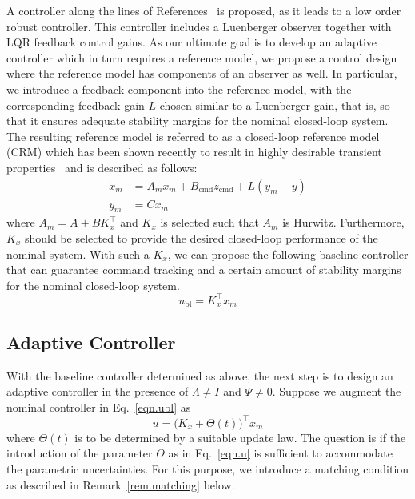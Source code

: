 \documentclass[]{../sty/JGCD}
\theoremstyle{examplestyle}
\begin{document}
  A controller along the lines of References\ \cite{lavretsky.output.2010,wise.obltrdesign.2013,qu.gnc.2013} is proposed, as it leads to a low order robust controller.
  This controller includes a Luenberger observer together with LQR feedback control gains.
  As our ultimate goal is to develop an adaptive controller which in turn requires a reference model, we propose a control design where the reference model has components of an observer as well.
  In particular, we introduce a feedback component into the reference model, with the corresponding feedback gain $L$ chosen similar to a Luenberger gain, that is, so that it ensures adequate stability margins for the nominal closed-loop system.
  The resulting reference model is referred to as a closed-loop reference model (CRM) which has been shown recently to result in highly desirable transient properties\ \cite{gibson.aiaacrm.2012,gibson.ecc.2013,gibson.ieeeaccess.2013,gibson.acc.2013} and is described as follows:
  \begin{equation}
    \begin{split}
      \label{eqn.refmodel}
      \dot{x}_{m}&=A_{m}x_{m}+B_{\text{cmd}}z_{\text{cmd}}+L(y_{m}-y) \\
      y_{m}&=Cx_{m}
    \end{split}
  \end{equation}
  where $A_{m}=A+BK_{x}^{\top}$ and $K_{x}$ is selected such that $A_{m}$ is Hurwitz.
  Furthermore, $K_{x}$ should be selected to provide the desired closed-loop performance of the nominal system.
  With such a $K_{x}$, we can propose the following baseline controller that can guarantee command tracking and a certain amount of stability margins for the nominal closed-loop system.
  \begin{equation}
    \label{eqn.ubl}
    u_{\text{bl}}=K_{x}^{\top}x_{m}
  \end{equation}

  \subsection{Adaptive Controller}

  With the baseline controller determined as above, the next step is to design an adaptive controller in the presence of $\Lambda\neq I$ and $\Psi\neq 0$. Suppose we augment the nominal controller in Eq.\ \eqref{eqn.ubl} as
  \begin{equation}
    \label{eqn.u}
    u=\bigr(K_{x}+\Theta(t)\bigr)^{\top}x_{m}
  \end{equation}
  where $\Theta(t)$ is to be determined by a suitable update law.
  The question is if the introduction of the parameter $\Theta$ as in Eq.\ \eqref{eqn.u} is sufficient to accommodate the parametric uncertainties.
  For this purpose, we introduce a matching condition as described in Remark~\ref{rem.matching} below.
\end{document}
